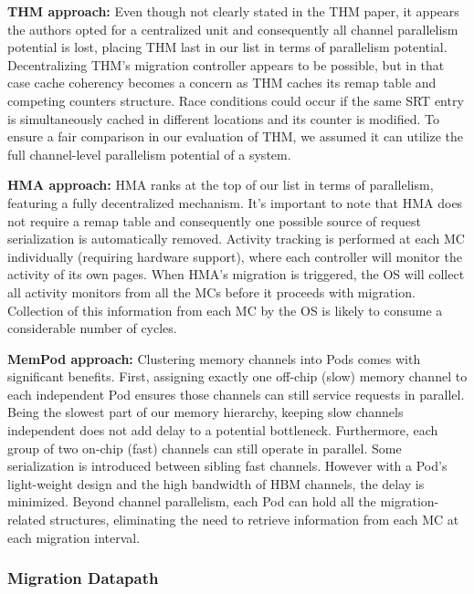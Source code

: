 	\textbf{THM approach:} Even though not clearly stated in the THM paper, it appears the authors opted for a centralized unit and consequently all channel parallelism potential is lost, placing THM last in our list in terms of parallelism potential. Decentralizing THM's migration controller appears to be possible, but in that case cache coherency becomes a concern as THM caches its remap table and competing counters structure. Race conditions could occur if the same SRT entry is simultaneously cached in different locations and its counter is modified. To ensure a fair comparison in our evaluation of THM, we assumed it can utilize the full channel-level parallelism potential of a system. 
	
	\textbf{HMA approach:} HMA ranks at the top of our list in terms of parallelism, featuring a fully decentralized mechanism. It's important to note that HMA does not require a remap table and consequently one possible source of request serialization is automatically removed. Activity tracking is performed at each MC individually (requiring hardware support), where each controller will monitor the activity of its own pages. When HMA's migration is triggered, the OS will collect all activity monitors from all the MCs before it proceeds with migration. Collection of this information from each MC by the OS is likely to consume a considerable number of cycles.
	
	\textbf{MemPod approach:} Clustering memory channels into Pods comes with significant benefits. First, assigning exactly one off-chip (slow) memory channel to each independent Pod ensures those channels can still service requests in parallel. Being the slowest part of our memory hierarchy, keeping slow channels independent does not add delay to a potential bottleneck. Furthermore, each group of two on-chip (fast) channels can still operate in parallel. Some serialization is introduced between sibling fast channels. However with a Pod's light-weight design and the high bandwidth of HBM channels, the delay is minimized. Beyond channel parallelism, each Pod can hold all the migration-related structures, eliminating the need to retrieve information from each MC at each migration interval.
	

\subsubsection{Migration Datapath}


